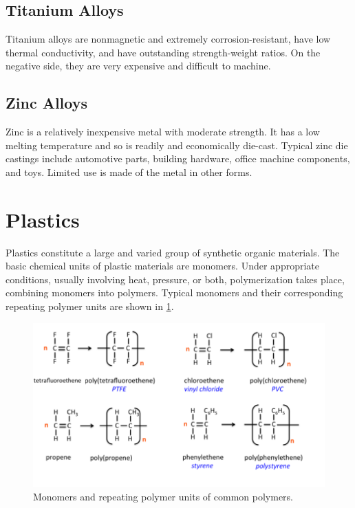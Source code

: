 \documentclass[
10pt,
a4paper,
openany,
svgnames,
]{book}
\begin{document}
\subsection{Titanium Alloys}

Titanium alloys are nonmagnetic and extremely corrosion-resistant, have low thermal conductivity, and have outstanding strength-weight ratios. On the negative side, they are very expensive and difficult to machine. 

\subsection{Zinc Alloys}

Zinc is a relatively inexpensive metal with moderate strength. It has a low melting temperature and so is readily and economically die-cast. Typical zinc die castings include automotive parts, building hardware, office machine components, and toys. Limited use is made of the metal in other forms.

\section{Plastics}

Plastics constitute a large and varied group of synthetic organic materials. The basic chemical units of plastic materials are monomers. Under appropriate conditions, usually involving heat, pressure, or both, polymerization takes place, combining monomers into polymers. Typical monomers and their corresponding repeating polymer units are shown in \cref{fig: polymers and repeating units}.

\begin{figure}[h]
  \centering
  \includegraphics[scale=0.5]{pictures/Material-selection/polymer}
  \caption{Monomers and repeating polymer units of common polymers. \cite{secondaryscience4all}}
  \label{fig: polymers and repeating units}
\end{figure}
 
\end{document}
